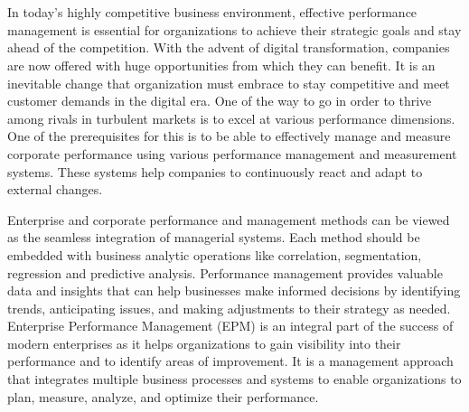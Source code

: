\documentclass[12pt,a4paper,openright,twoside]{book}
\begin{document}
\tableofcontents   

\mainmatter

\chapter{\introductionname}
\label{chap:introduction}

In today's highly competitive business environment, effective performance management is essential for organizations to achieve their strategic goals and stay ahead of the competition.
%
With the advent of digital transformation, companies are now offered with huge opportunities from which they can benefit.
%
It is an inevitable change that organization must embrace to stay competitive and meet customer demands in the digital era.
%
One of the way to go in order to thrive among rivals in turbulent markets is to excel at various performance dimensions. 
%
One of the prerequisites for this is to be able to effectively manage and measure corporate performance using various performance management and measurement systems. 
%
These systems help companies to continuously react and adapt to external changes.

Enterprise and corporate performance and management methods can be viewed as the seamless integration of managerial systems. 
%
Each method should be embedded with business analytic operations like correlation, segmentation, regression and predictive analysis.
%
Performance management provides valuable data and insights that can help businesses make informed decisions by identifying trends, anticipating issues, and making adjustments to their strategy as needed.
%
Enterprise Performance Management (EPM) is an integral part of the success of modern enterprises as it helps organizations to gain visibility into their performance and to identify areas of improvement.
%
It is a management approach that integrates multiple business processes and systems to enable organizations to plan, measure, analyze, and optimize their performance.
\end{document}
